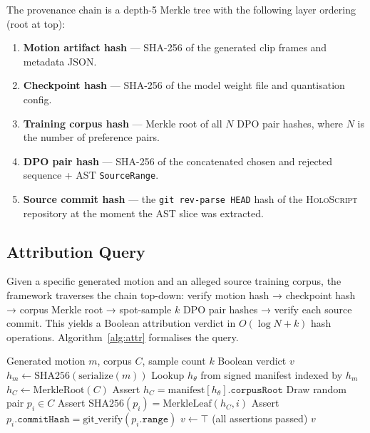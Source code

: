 \documentclass[sigconf,nonacm]{acmart}
\newcommand{\holoscript}{\textsc{HoloScript}}
\begin{document}
The provenance chain is a depth-5 Merkle tree with the following layer
ordering (root at top):

\begin{enumerate}
  \item \textbf{Motion artifact hash} — SHA-256 of the generated clip frames
        and metadata JSON.
  \item \textbf{Checkpoint hash} — SHA-256 of the model weight file and
        quantisation config.
  \item \textbf{Training corpus hash} — Merkle root of all $N$ DPO pair
        hashes, where $N$ is the number of preference pairs.
  \item \textbf{DPO pair hash} — SHA-256 of the concatenated chosen and
        rejected sequence + AST \texttt{SourceRange}.
  \item \textbf{Source commit hash} — the \texttt{git rev-parse HEAD} hash
        of the \holoscript{} repository at the moment the AST slice was
        extracted.
\end{enumerate}

\subsection{Attribution Query}
\label{sec:training:attr}
Given a specific generated motion and an alleged source training corpus, the
framework traverses the chain top-down: verify motion hash → checkpoint hash
→ corpus Merkle root → spot-sample $k$ DPO pair hashes → verify each source
commit. This yields a Boolean attribution verdict in $O(\log N + k)$ hash
operations. Algorithm~\ref{alg:attr} formalises the query.

\begin{algorithm}
  \caption{Provenance Attribution Query}
  \label{alg:attr}
  \begin{algorithmic}[1]
    \Require Generated motion $m$, corpus $C$, sample count $k$
    \Ensure Boolean verdict $v$
    \State $h_m \gets \mathrm{SHA256}(\mathrm{serialize}(m))$
    \State Lookup $h_\theta$ from signed manifest indexed by $h_m$
    \State $h_C \gets \mathrm{MerkleRoot}(C)$
    \State Assert $h_C = \mathrm{manifest}[h_\theta].\texttt{corpusRoot}$
      \State Draw random pair $p_i \in C$
      \State Assert $\mathrm{SHA256}(p_i) = \mathrm{MerkleLeaf}(h_C, i)$
      \State Assert $p_i.\texttt{commitHash} = \mathrm{git\_verify}(p_i.\texttt{range})$
    \EndFor
    \State $v \gets \top$ (all assertions passed)
    \State \Return $v$
  \end{algorithmic}
\end{algorithm}
\end{document}
